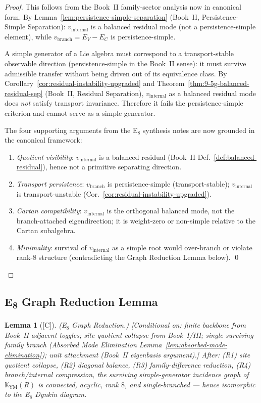 \documentclass[12pt,oneside]{amsbook}
\theoremstyle{plain}
\newtheorem{lemma}[theorem]{Lemma}
\theoremstyle{definition}
\theoremstyle{remark}
\newcommand{\status}[1]{\textup{[#1]}}
\begin{document}
\begin{proof}
This follows from the Book~II family-sector analysis now in canonical
form. By Lemma~\ref{lem:persistence-simple-separation}
(Book~II, Persistence-Simple Separation):
$v_{\mathrm{internal}}$ is a balanced residual mode (not a
persistence-simple element), while $v_{\mathrm{branch}} = E_V - E_C$
is persistence-simple.

A simple generator of a Lie algebra must correspond to a
transport-stable observable direction (persistence-simple in the
Book~II sense): it must survive admissible transfer without being
driven out of its equivalence class. By
Corollary~\ref{cor:residual-instability-upgraded} and
Theorem~\ref{thm:9-5g-balanced-residual-sep} (Book~II, Residual
Separation), $v_{\mathrm{internal}}$ as a balanced residual mode does
\emph{not} satisfy transport invariance. Therefore it fails the
persistence-simple criterion and cannot serve as a simple generator.

The four supporting arguments from the E$_8$ synthesis notes are now
grounded in the canonical framework:
\begin{enumerate}[label=\textup{(\arabic*)}]
 \item \emph{Quotient visibility}: $v_{\mathrm{internal}}$ is a
 balanced residual (Book~II Def.~\ref{def:balanced-residual}),
 hence not a primitive separating direction.
 \item \emph{Transport persistence}: $v_{\mathrm{branch}}$ is
 persistence-simple (transport-stable); $v_{\mathrm{internal}}$ is
 transport-unstable (Cor.~\ref{cor:residual-instability-upgraded}).
 \item \emph{Cartan compatibility}: $v_{\mathrm{internal}}$ is the
 orthogonal balanced mode, not the branch-attached eigendirection;
 it is weight-zero or non-simple relative to the Cartan subalgebra.
 \item \emph{Minimality}: survival of $v_{\mathrm{internal}}$ as a
 simple root would over-branch or violate rank-8 structure
 (contradicting the Graph Reduction Lemma below). \qed
\end{enumerate}
\end{proof}

\subsection{E\textsubscript{8} Graph Reduction Lemma}

\begin{lemma}[\status{C}]\label{lem:E8-graph-reduction}
\textup{(E$_8$ Graph Reduction.)}
\textup{[Conditional on: finite backbone from Book~II adjacent toggles;
site quotient collapse from Book~I/III; single surviving family branch
(Absorbed Mode Elimination Lemma~\ref{lem:absorbed-mode-elimination});
unit attachment (Book~II eigenbasis argument).]}
After: \textup{(R1)} site quotient collapse, \textup{(R2)} diagonal
balance, \textup{(R3)} family-difference reduction, \textup{(R4)}
branch/internal compression, the surviving simple-generator incidence
graph of $\mathbb{K}_{\mathrm{YM}}(R)$ is connected, acyclic, rank
$8$, and single-branched --- hence isomorphic to the E$_8$ Dynkin
diagram.
\end{lemma}
\end{document}
